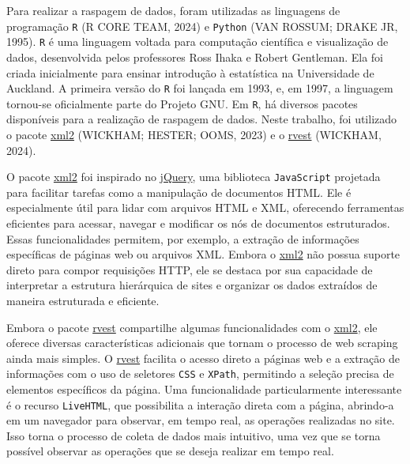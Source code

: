 \documentclass[
  12pt,
  a4paper,
]{scrreprt}
\begin{document}
Para realizar a raspagem de dados, foram utilizadas as linguagens de
programação \texttt{R} (R CORE TEAM, 2024) e \texttt{Python} (VAN
ROSSUM; DRAKE JR, 1995). \texttt{R} é uma linguagem voltada para
computação científica e visualização de dados, desenvolvida pelos
professores Ross Ihaka e Robert Gentleman. Ela foi criada inicialmente
para ensinar introdução à estatística na Universidade de Auckland. A
primeira versão do \texttt{R} foi lançada em 1993, e, em 1997, a
linguagem tornou-se oficialmente parte do Projeto GNU. Em \texttt{R}, há
diversos pacotes disponíveis para a realização de raspagem de dados.
Neste trabalho, foi utilizado o pacote
\href{https://xml2.r-lib.org/}{xml2} (WICKHAM; HESTER; OOMS, 2023) e o
\href{https://rvest.tidyverse.org/}{rvest} (WICKHAM, 2024).

\vspace{12pt}

O pacote \href{https://xml2.r-lib.org/}{xml2} foi inspirado no
\href{https://jquery.com/}{jQuery}, uma biblioteca \texttt{JavaScript}
projetada para facilitar tarefas como a manipulação de documentos HTML.
Ele é especialmente útil para lidar com arquivos HTML e XML, oferecendo
ferramentas eficientes para acessar, navegar e modificar os nós de
documentos estruturados. Essas funcionalidades permitem, por exemplo, a
extração de informações específicas de páginas web ou arquivos XML.
Embora o \href{https://xml2.r-lib.org/}{xml2} não possua suporte direto
para compor requisições HTTP, ele se destaca por sua capacidade de
interpretar a estrutura hierárquica de sites e organizar os dados
extraídos de maneira estruturada e eficiente.

\vspace{12pt}

Embora o pacote \href{https://rvest.tidyverse.org/}{rvest} compartilhe
algumas funcionalidades com o \href{https://xml2.r-lib.org/}{xml2}, ele
oferece diversas características adicionais que tornam o processo de web
scraping ainda mais simples. O
\href{https://rvest.tidyverse.org/}{rvest} facilita o acesso direto a
páginas web e a extração de informações com o uso de seletores
\texttt{CSS} e \texttt{XPath}, permitindo a seleção precisa de elementos
específicos da página. Uma funcionalidade particularmente interessante é
o recurso \texttt{LiveHTML}, que possibilita a interação direta com a
página, abrindo-a em um navegador para observar, em tempo real, as
operações realizadas no site. Isso torna o processo de coleta de dados
mais intuitivo, uma vez que se torna possível observar as operações que
se deseja realizar em tempo real.
\end{document}
